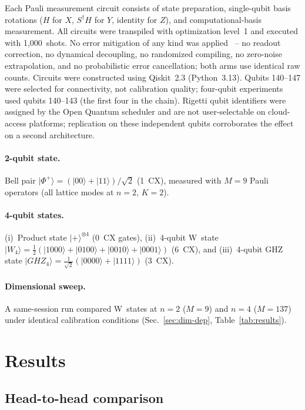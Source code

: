 \documentclass[twocolumn,prx,aps,superscriptaddress,longbibliography,floatfix]{revtex4-2}
\begin{document}
Each Pauli measurement circuit consists of state preparation,
single-qubit basis rotations ($H$ for $X$, $S^\dagger H$ for $Y$,
identity for $Z$), and computational-basis measurement.  All circuits
were transpiled with optimization level~1 and executed with 1{,}000~shots.
No error mitigation of any kind was applied~\cite{Schwemmer2015} --
no readout correction, no dynamical decoupling, no randomized
compiling, no zero-noise extrapolation, and no probabilistic error
cancellation; both arms use identical raw counts.
Circuits were constructed using Qiskit~2.3 (Python~3.13).
Qubits 140--147 were selected for connectivity, not calibration
quality; four-qubit experiments used qubits 140--143 (the first
four in the chain).  Rigetti qubit identifiers were assigned by
the Open Quantum scheduler and are not user-selectable on
cloud-access platforms; replication on these independent qubits
corroborates the effect on a second architecture.

\paragraph{2-qubit state.}
Bell pair $|\Phi^+\rangle = (|00\rangle + |11\rangle)/\sqrt{2}$
(1~CX), measured with $M = 9$ Pauli operators (all lattice modes
at $n = 2$, $K = 2$).

\paragraph{4-qubit states.}
(i)~Product state $|{+}\rangle^{\otimes 4}$ (0~CX
gates), (ii)~4-qubit W~state
$|W_4\rangle = \tfrac{1}{2}(|1000\rangle + |0100\rangle +
|0010\rangle + |0001\rangle)$ (6~CX), and (iii)~4-qubit GHZ state
$|GHZ_4\rangle = \tfrac{1}{\sqrt{2}}(|0000\rangle + |1111\rangle)$
(3~CX).

\paragraph{Dimensional sweep.}
A same-session run compared W~states at $n = 2$ ($M = 9$) and
$n = 4$ ($M = 137$) under identical calibration conditions
(Sec.~\ref{sec:dim-dep}, Table~\ref{tab:results}).

\section{Results}
\label{sec:results}

\subsection{Head-to-head comparison}
\label{sec:head-to-head}
\end{document}
